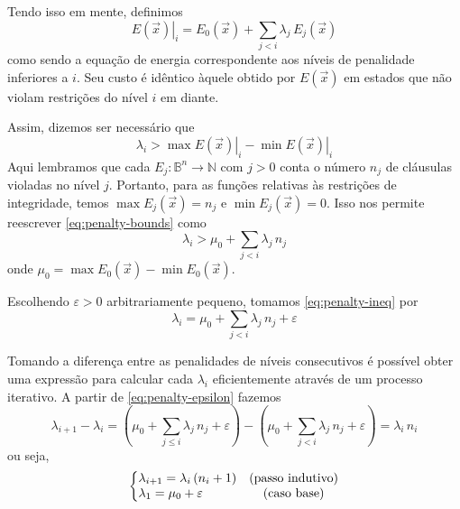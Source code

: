 Tendo isso em mente, definimos
\begin{equation}
    \left. E \left({ \vec{x} }\right)\right|_{i} = E_0 \left({ \vec{x} }\right) + \sum_{j < i} \lambda_{j}\, E_{j} \left({ \vec{x} }\right) \nonumber
\end{equation}
como sendo a equação de energia correspondente aos níveis de penalidade inferiores a $i$. Seu custo é idêntico àquele obtido por $E\left({\vec{x}}\right)$ em estados que não violam restrições do nível $i$ em diante.

Assim, dizemos ser necessário que
\begin{equation}
    \lambda_{i} > \max \left. E \left({ \vec{x} }\right)\right|_{i} - \min \left. E \left({ \vec{x} }\right)\right|_{i} \label{eq:penalty-bounds}
\end{equation}
Aqui lembramos que cada $E_j : \mathbb{B}^{n} \to \mathbb{N}$ com $j > 0$ conta o número $n_j$ de cláusulas violadas no nível $j$. Portanto, para as funções relativas às restrições de integridade, temos $\max E_j \left({ \vec{x} }\right) = n_j$ e $\min E_j \left({ \vec{x} }\right) = 0$. Isso nos permite reescrever \eqref{eq:penalty-bounds} como
\begin{equation}
    \lambda_{i} > \mu_0 + \sum_{j < i} \lambda_{j}\, n_j \label{eq:penalty-ineq}
\end{equation}
onde $\mu_0 = \max E_0 \left({ \vec{x} }\right) - \min E_0 \left({ \vec{x} }\right)$.

Escolhendo $\varepsilon > 0$ arbitrariamente pequeno, tomamos \eqref{eq:penalty-ineq} por
\begin{equation}
    \lambda_{i} = \mu_0 + \sum_{j < i} \lambda_{j}\, n_{j} + \varepsilon \label{eq:penalty-epsilon}
\end{equation}

Tomando a diferença entre as penalidades de níveis consecutivos é possível obter uma expressão para calcular cada $\lambda_{i}$ eficientemente através de um processo iterativo. A partir de \eqref{eq:penalty-epsilon} fazemos
\begin{equation}
    \lambda_{i + 1} - \lambda_{i} = \left({\mu_0 + \sum_{j \le i} \lambda_{j}\, n_j} + \varepsilon \right) - \left({\mu_0 + \sum_{j < i} \lambda_{j}\, n_j} + \varepsilon \right) = \lambda_{i}\,n_{i} \nonumber
\end{equation}
ou seja,
\begin{equation}
    \left\{%
    \begin{array}{@{} l c @{}}
        \lambda_{i + 1} = \lambda_{i}\, (n_{i} + 1) & \text{(passo indutivo)}\\
        \lambda_{1} = \mu_0 + \varepsilon & \text{(caso base)}
    \end{array}
    \right.%
\end{equation}

